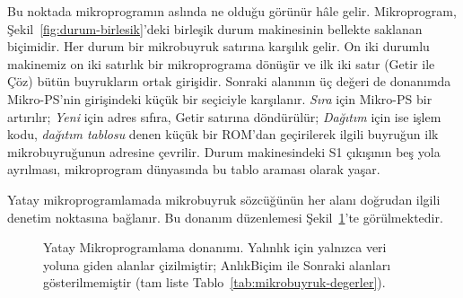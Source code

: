 Bu noktada mikroprogramın aslında ne olduğu görünür hâle gelir. Mikroprogram, Şekil~\ref{fig:durum-birlesik}'deki birleşik durum makinesinin bellekte saklanan biçimidir. Her durum bir mikrobuyruk satırına karşılık gelir. On iki durumlu makinemiz on iki satırlık bir mikroprograma dönüşür ve ilk iki satır (Getir ile Çöz) bütün buyrukların ortak girişidir. Sonraki alanının üç değeri de donanımda Mikro-PS'nin girişindeki küçük bir seçiciyle karşılanır. \emph{Sıra} için Mikro-PS bir artırılır; \emph{Yeni} için adres sıfıra, Getir satırına döndürülür; \emph{Dağıtım} için ise işlem kodu, \emph{dağıtım tablosu} denen küçük bir ROM'dan geçirilerek ilgili buyruğun ilk mikrobuyruğunun adresine çevrilir. Durum makinesindeki S1 çıkışının beş yola ayrılması, mikroprogram dünyasında bu tablo araması olarak yaşar.

Yatay mikroprogramlamada mikrobuyruk sözcüğünün her alanı doğrudan ilgili denetim noktasına bağlanır. Bu donanım düzenlemesi Şekil~\ref{fig:yatay-mikro-donanim}'te görülmektedir.

\begin{figure}[H]
\centering
{}
\caption[Yatay mikroprogramlama donanımı]{Yatay Mikroprogramlama donanımı. Yalınlık için yalnızca veri yoluna giden alanlar çizilmiştir; AnlıkBiçim ile Sonraki alanları gösterilmemiştir (tam liste Tablo~\ref{tab:mikrobuyruk-degerler}).}
\label{fig:yatay-mikro-donanim}
\end{figure}

